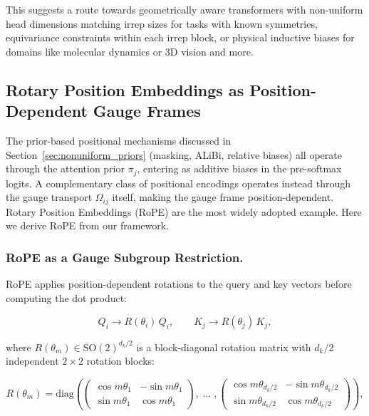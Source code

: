 \documentclass[twoside,11pt]{article}
\begin{document}
This suggests a route towards geometrically aware transformers with non-uniform head dimensions matching irrep sizes for tasks with known symmetries, equivariance constraints within each irrep block, or physical inductive biases for domains like molecular dynamics or 3D vision and more.


\subsection{Rotary Position Embeddings as Position-Dependent Gauge Frames}
\label{sec:rope}

The prior-based positional mechanisms discussed in Section~\ref{sec:nonuniform_priors} (masking, ALiBi, relative biases) all operate through the attention prior $\pi_j$, entering as additive biases in the pre-softmax logits. A complementary class of positional encodings operates instead through the gauge transport $\Omega_{ij}$ itself, making the gauge frame position-dependent. Rotary Position Embeddings (RoPE) \citep{su2024roformer} are the most widely adopted example. Here we derive RoPE from our framework.

\subsubsection{RoPE as a Gauge Subgroup Restriction.}

RoPE applies position-dependent rotations to the query and key vectors before computing the dot product:

\begin{equation}
Q_i \to R(\theta_i)\, Q_i, \qquad K_j \to R(\theta_j)\, K_j,
\end{equation}

where $R(\theta_m) \in \mathrm{SO}(2)^{d_k/2}$ is a block-diagonal rotation matrix with $d_k/2$ independent $2\times 2$ rotation blocks:

\begin{equation}
R(\theta_m) = \mathrm{diag}\!\left(
\begin{pmatrix} \cos m\theta_1 & -\sin m\theta_1 \\ \sin m\theta_1 & \cos m\theta_1 \end{pmatrix},
\;\ldots\;,
\begin{pmatrix} \cos m\theta_{d_k/2} & -\sin m\theta_{d_k/2} \\ \sin m\theta_{d_k/2} & \cos m\theta_{d_k/2} \end{pmatrix}
\right),
\label{eq:rope_rotation}
\end{equation}
\end{document}
